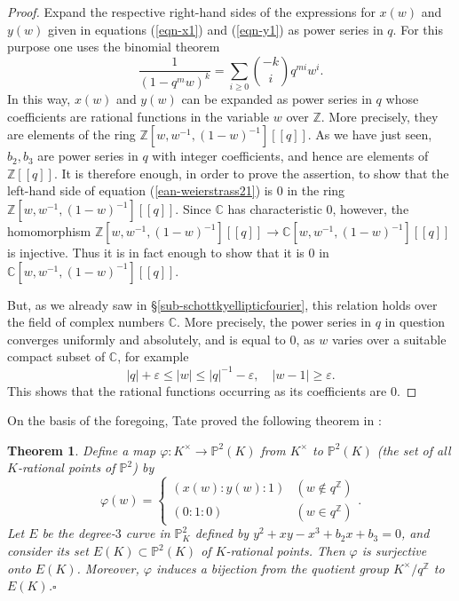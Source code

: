 \documentclass[a4paper,12pt, dvipdfmx]{jsbook}
\def\Z{\mathbb{Z}}
\def\C{\mathbb{C}}
\def\P{\mathbb{P}}
\newcommand{\abs}[1]{\lvert#1\rvert}
\theoremstyle{plain}
\newtheorem{thm}{\bfseries Theorem}[section]
\theoremstyle{definition}
\begin{document}
\begin{proof}[Proof]
Expand the respective right-hand sides of the expressions for $x(w)$ and $y(w)$ given in equations (\ref{eqn-x1}) and (\ref{eqn-y1}) as power series in $q$.
For this purpose one uses the binomial theorem
$$
\frac{1}{(1-q^mw)^k}=\sum_{i\geq 0}{-k\choose i}q^{mi}w^i.
$$
In this way, $x(w)$ and $y(w)$ can be expanded as power series in $q$ whose coefficients are rational functions in the variable $w$ over $\Z$.
More precisely, they are elements of the ring $\Z[w,w^{-1},(1-w)^{-1}][\![q]\!]$.
As we have just seen, $b_2,b_3$ are power series in $q$ with integer coefficients, and hence are elements of $\Z[\![q]\!]$.
It is therefore enough, in order to prove the assertion, to show that the left-hand side of equation (\ref{ean-weierstrass21}) is $0$ in the ring $\Z[w,w^{-1},(1-w)^{-1}][\![q]\!]$.
Since $\C$ has characteristic $0$, however, the homomorphism $\Z[w,w^{-1},(1-w)^{-1}][\![q]\!]\rightarrow\C[w,w^{-1},(1-w)^{-1}][\![q]\!]$ is injective. Thus it is in fact enough to show that it is $0$ in $\C[w,w^{-1},(1-w)^{-1}][\![q]\!]$.

But, as we already saw in \S\ref{sub-schottkyellipticfourier}, this relation holds over the field of complex numbers $\C$.
More precisely, the power series in $q$ in question converges uniformly and absolutely, and is equal to $0$, as $w$ varies over a suitable compact subset of $\C$, for example
$$
\abs{q}+\varepsilon\leq\abs{w}\leq\abs{q}^{-1}-\varepsilon,\quad\abs{w-1}\geq\varepsilon.
$$
This shows that the rational functions occurring as its coefficients are $0$.
\end{proof}

On the basis of the foregoing, Tate proved the following theorem in \cite[Theorem 1]{Tate2}:
\begin{thm}\label{thm-relationxy}{\rm 
Define a map $\varphi\colon K^{\times}\rightarrow\P^2(K)$ from $K^{\times}$ to $\P^2(K)$ (the set of all $K$-rational points of $\P^2$) by
$$
\varphi(w)=\left\{\begin{array}{cl} (x(w):y(w):1)&(w\not\in q^{\Z})\\ (0:1:0)&(w\in q^{\Z})\end{array}\right..%
$$
Let $E$ be the degree-$3$ curve in $\P^2_K$ defined by $y^2+xy-x^3+b_2x+b_3=0$, and consider its set $E(K)\subset\P^2(K)$ of $K$-rational points.
Then $\varphi$ is surjective onto $E(K)$.
Moreover, $\varphi$ induces a bijection from the quotient group $K^{\times}/q^{\Z}$ to $E(K)$.}\hfill$\square$
\end{thm}
\end{document}
